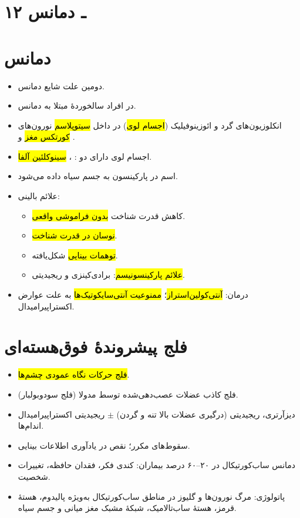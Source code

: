 \section*{۱۲ ـ دمانس}
\section{دمانس }
\begin{itemize}
\item دومین علت شایع دمانس.
\item در  افراد سالخوردهٔ مبتلا به دمانس.
\item انکلوزیون‌های گرد و ائوزینوفیلیک (\hl{اجسام لوی}) در داخل \hl{سیتوپلاسم} نورون‌های \hl{کورتکس مغز} و \hl{}.
\item اجسام لوی دارای دو : \hl{}، \hl{سینوکلئین آلفا}.
\item اسم در پارکینسون به جسم سیاه داده می‌شود.
\item علائم بالینی:
\begin{itemize}
\item کاهش قدرت شناخت \hl{بدون فراموشی واقعی}.
\item \hl{نوسان در قدرت شناخت}.
\item \hl{توهمات بینایی} شکل‌یافته.
\item \hl{علائم پارکینسونیسم}: برادی‌کینزی و ریجیدیتی.
\end{itemize}
\item درمان: \hl{آنتی‌کولین‌استراز}؛ \hl{ممنوعیت آنتی‌سایکوتیک‌ها} به علت عوارض اکستراپیرامیدال.
\end{itemize}
\section{فلج پیشروندهٔ فوق‌هسته‌ای}
\begin{itemize}
\item \hl{فلج حرکات نگاه عمودی چشم‌ها}.
\item فلج کاذب عضلات عصب‌دهی‌شده توسط مدولا (فلج سودوبولبار).
\item دیزآرتری، ریجیدیتی (درگیری عضلات بالا تنه و گردن) $\pm$ ریجیدیتی اکستراپیرامیدال اندام‌ها.
\item سقوط‌های مکرر؛ نقص در یادآوری اطلاعات بینایی.
\item دمانس ساب‌کورتیکال در ۲۰–۶۰ درصد بیماران: کندی فکر، فقدان حافظه، تغییرات شخصیت.
\item پاتولوژی: مرگ نورون‌ها و گلیوز در مناطق ساب‌کورتیکال به‌ویژه پالیدوم، هستهٔ قرمز، هستهٔ ساب‌تالامیک، شبکهٔ مشبک مغز میانی و جسم سیاه.
\end{itemize}

